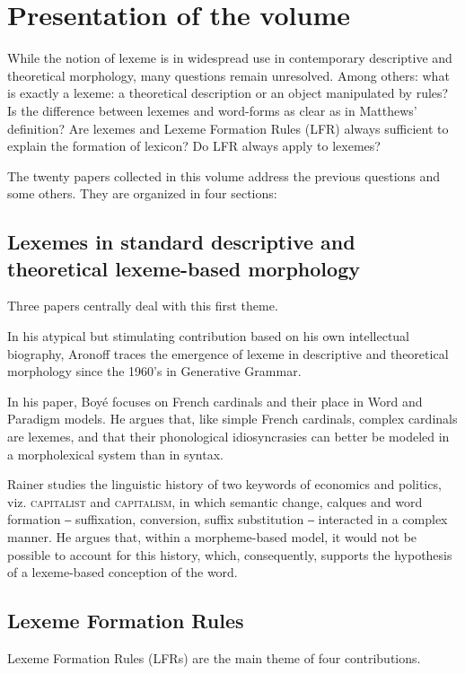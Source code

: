 \documentclass[output=paper]{langsci/langscibook}
\begin{document}
\section{Presentation of the volume}

While the notion of lexeme is in widespread use in contemporary
descriptive and theoretical morphology, many questions remain
unresolved. Among others: what is exactly a lexeme: a theoretical
description or an object manipulated by rules? Is the difference between
lexemes and word-forms as clear as in Matthews' definition? Are lexemes
and Lexeme Formation Rules (LFR) always sufficient to explain the
formation of lexicon? Do LFR always apply to lexemes?

The twenty papers collected in this volume address the previous
questions and some others. They are organized in four sections:

\subsection{Lexemes in standard descriptive and theoretical lexeme-based
morphology}

Three papers centrally deal with this first theme.

In his atypical but stimulating contribution based on his own
intellectual biography, Aronoff traces the emergence of lexeme in
descriptive and theoretical morphology since the 1960's in Generative
Grammar.

In his paper, Boyé focuses on French cardinals and their place in Word
and Paradigm models. He argues that, like simple French cardinals, complex
cardinals are lexemes, and that their phonological idiosyncrasies can
better be modeled in a morpholexical system than in syntax.

Rainer studies the linguistic history of two keywords of economics and
politics, viz. \textsc{capitalist} and \textsc{capitalism}, in which semantic change,
calques and word formation ‒ suffixation, conversion, suffix
substitution ‒ interacted in a complex manner. He argues that, within a
morpheme-based model, it would not be possible to account for this
history, which, consequently, supports the hypothesis of a lexeme-based
conception of the word.

\subsection{Lexeme Formation Rules}

Lexeme Formation Rules (LFRs) are the main theme of four contributions.
\end{document}
